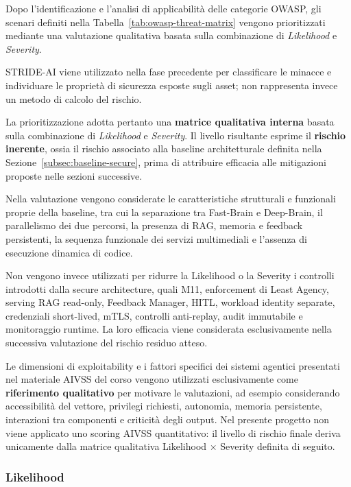 \documentclass[11pt,a4paper]{article}
\begin{document}
Dopo l'identificazione e l'analisi di applicabilità delle categorie
OWASP, gli scenari definiti nella
Tabella~\ref{tab:owasp-threat-matrix} vengono prioritizzati mediante
una valutazione qualitativa basata sulla combinazione di
\emph{Likelihood} e \emph{Severity}.

STRIDE-AI viene utilizzato nella fase precedente per classificare le
minacce e individuare le proprietà di sicurezza esposte sugli asset;
non rappresenta invece un metodo di calcolo del rischio.

La prioritizzazione adotta pertanto una \textbf{matrice qualitativa
interna} basata sulla combinazione di \emph{Likelihood} e
\emph{Severity}. Il livello risultante esprime il \textbf{rischio
inerente}, ossia il rischio associato alla baseline architetturale
definita nella Sezione~\ref{subsec:baseline-secure}, prima di attribuire
efficacia alle mitigazioni proposte nelle sezioni successive.

Nella valutazione vengono considerate le caratteristiche strutturali e
funzionali proprie della baseline, tra cui la separazione tra Fast-Brain
e Deep-Brain, il parallelismo dei due percorsi, la presenza di RAG,
memoria e feedback persistenti, la sequenza funzionale dei servizi
multimediali e l'assenza di esecuzione dinamica di codice.

Non vengono invece utilizzati per ridurre la Likelihood o la Severity
i controlli introdotti dalla secure architecture, quali M11,
enforcement di Least Agency, serving RAG read-only, Feedback Manager,
HITL, workload identity separate, credenziali short-lived, mTLS,
controlli anti-replay, audit immutabile e monitoraggio runtime. La loro
efficacia viene considerata esclusivamente nella successiva valutazione
del rischio residuo atteso.

Le dimensioni di exploitability e i fattori specifici dei sistemi
agentici presentati nel materiale AIVSS del corso
\cite{damianiagentic} vengono utilizzati esclusivamente come
\textbf{riferimento qualitativo} per motivare le valutazioni, ad
esempio considerando accessibilità del vettore, privilegi richiesti,
autonomia, memoria persistente, interazioni tra componenti e criticità
degli output. Nel presente progetto non viene applicato uno scoring
AIVSS quantitativo: il livello di rischio finale deriva unicamente
dalla matrice qualitativa Likelihood $\times$ Severity definita di
seguito.

\subsubsection*{Likelihood}
\end{document}
